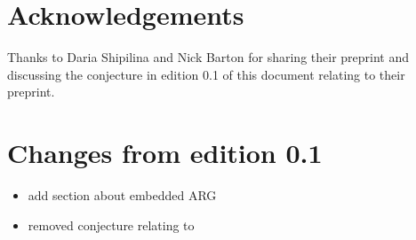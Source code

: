 \documentclass{article}
\begin{document}
\section{Acknowledgements}

Thanks to Daria Shipilina and Nick Barton for sharing their preprint
\cite{shipilina_origin_2022} and discussing the conjecture in edition
0.1 of this document relating to their preprint.

\section{Changes from edition 0.1}

\begin{itemize}
\item
  add section about embedded ARG
\item
  removed conjecture relating to \cite{shipilina_origin_2022}
\end{itemize}


\printbibliography
\end{document}
